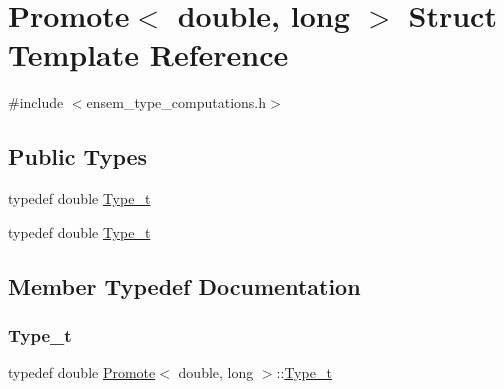 \hypertarget{structPromote_3_01double_00_01long_01_4}{}\section{Promote$<$ double, long $>$ Struct Template Reference}
\label{structPromote_3_01double_00_01long_01_4}


{\ttfamily \#include $<$ensem\+\_\+type\+\_\+computations.\+h$>$}

\subsection*{Public Types}
\begin{DoxyCompactItemize}
\item 
typedef double \mbox{\hyperlink{structPromote_3_01double_00_01long_01_4_a7c2dadf6e46df10fbef16312d46706ab}{Type\+\_\+t}}
\item 
typedef double \mbox{\hyperlink{structPromote_3_01double_00_01long_01_4_a7c2dadf6e46df10fbef16312d46706ab}{Type\+\_\+t}}
\end{DoxyCompactItemize}


\subsection{Member Typedef Documentation}
\mbox{\label{structPromote_3_01double_00_01long_01_4_a7c2dadf6e46df10fbef16312d46706ab}} 
\subsubsection{\texorpdfstring{Type\_t}{Type\_t}\hspace{0.1cm}{\footnotesize\ttfamily [1/2]}}
{\footnotesize\ttfamily typedef double \mbox{\hyperlink{structPromote}{Promote}}$<$ double, long $>$\+::\mbox{\hyperlink{structPromote_3_01double_00_01long_01_4_a7c2dadf6e46df10fbef16312d46706ab}{Type\+\_\+t}}}

\mbox{\label{structPromote_3_01double_00_01long_01_4_a7c2dadf6e46df10fbef16312d46706ab}} 
